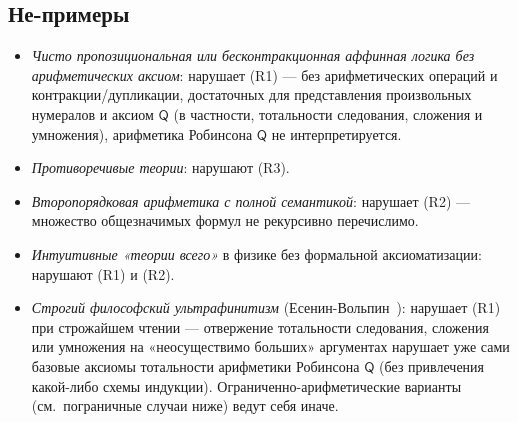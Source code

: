 \documentclass[11pt]{article}
\theoremstyle{plain}
\theoremstyle{definition}
\begin{document}
\subsection{Не-примеры}

\begin{itemize}
\item \emph{Чисто пропозициональная или бесконтракционная аффинная логика без арифметических аксиом}: нарушает (R1) --- без арифметических операций и контракции/дупликации, достаточных для представления произвольных нумералов и аксиом $\mathsf{Q}$ (в частности, тотальности следования, сложения и умножения), арифметика Робинсона $\mathsf{Q}$ не интерпретируется.
\item \emph{Противоречивые теории}: нарушают (R3).
\item \emph{Второпорядковая арифметика с полной семантикой}: нарушает (R2) --- множество общезначимых формул не рекурсивно перечислимо.
\item \emph{Интуитивные «теории всего»} в физике без формальной аксиоматизации: нарушают (R1) и (R2).
\item \emph{Строгий философский ультрафинитизм} (Есенин-Вольпин~\cite{EseninVolpin1961,EseninVolpin1970}): нарушает (R1) при строжайшем чтении --- отвержение тотальности следования, сложения или умножения на «неосуществимо больших» аргументах нарушает уже сами базовые аксиомы тотальности арифметики Робинсона $\mathsf{Q}$ (без привлечения какой-либо схемы индукции). Ограниченно-арифметические варианты (см.\ пограничные случаи ниже) ведут себя иначе.
\end{itemize}
\end{document}
